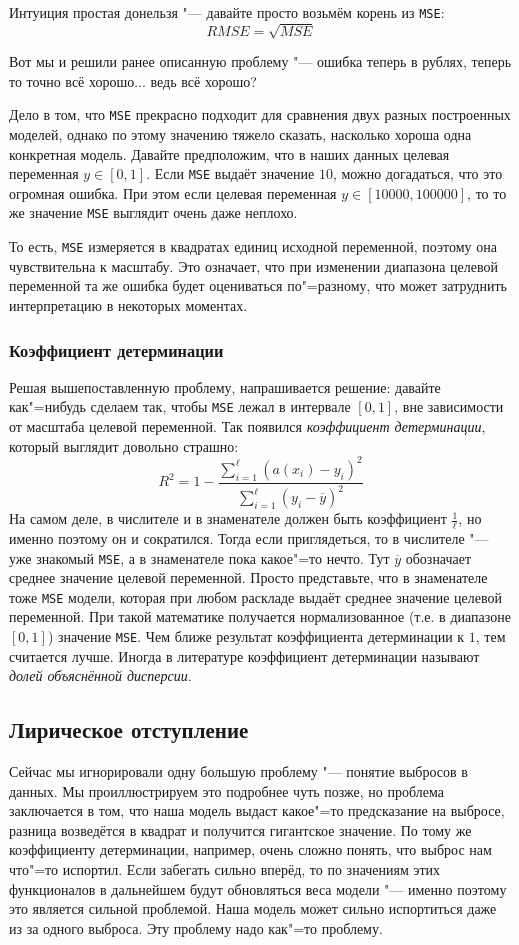 Интуиция простая донельзя "--- давайте просто возьмём корень из 
\texttt{MSE}:
\[
RMSE = \sqrt{MSE}
\]

Вот мы и решили ранее описанную проблему "--- ошибка теперь в рублях, 
теперь то точно всё хорошо... ведь всё хорошо?

Дело в том, что \texttt{MSE} прекрасно подходит для сравнения 
двух разных построенных моделей, однако по этому значению тяжело сказать,
насколько хороша одна конкретная модель. Давайте предположим, что 
в наших данных целевая переменная $y \in [0, 1]$. Если 
\texttt{MSE} выдаёт значение $10$, можно догадаться, что это огромная ошибка. При этом если целевая переменная $y \in [10000, 100000]$, то 
то же значение \texttt{MSE} выглядит очень даже неплохо.

То есть, \texttt{MSE} измеряется в квадратах единиц исходной переменной, поэтому она чувствительна к масштабу. Это означает, 
что при изменении диапазона целевой переменной та же ошибка будет оцениваться по"=разному, что может затруднить интерпретацию
в некоторых моментах.

\subsubsection*{Коэффициент детерминации}
Решая вышепоставленную проблему, напрашивается решение: давайте как"=нибудь сделаем так, чтобы \texttt{MSE} лежал в интервале 
$[0, 1]$, вне зависимости от масштаба целевой переменной. 
Так появился \textit{коэффициент детерминации}, который выглядит довольно
страшно:
\[
R^2 = 1 - \frac{\sum_{i=1}^\ell (a(x_i) - y_i)^2}{\sum_{i=1}^\ell (y_i - \overline{y})^2}
\]
На самом деле, в числителе и в знаменателе 
должен быть коэффициент $\frac{1}{\ell}$, но именно поэтому он и сократился.
Тогда если приглядеться, то в числителе "--- уже знакомый \texttt{MSE}, а в знаменателе пока какое"=то нечто. Тут $\overline{y}$ обозначает среднее значение целевой переменной. Просто представьте, что в знаменателе тоже 
\texttt{MSE} модели, которая при любом раскладе выдаёт среднее значение 
целевой переменной. При такой математике получается нормализованное (т.е. 
в диапазоне $[0, 1]$) значение \texttt{MSE}. Чем ближе результат
коэффициента детерминации к $1$, тем считается лучше. Иногда в 
литературе коэффициент детерминации называют \textit{долей объяснённой дисперсии}.

\subsection*{Лирическое отступление}
Сейчас мы игнорировали одну большую проблему "--- понятие выбросов в 
данных. Мы проиллюстрируем это подробнее чуть позже, но проблема заключается в том, что наша модель выдаст какое"=то предсказание 
на выбросе, разница возведётся в квадрат и получится гигантское значение.
По тому же коэффициенту детерминации, например, очень сложно понять,
что выброс нам что"=то испортил. Если забегать сильно вперёд, то 
по значениям этих функционалов в дальнейшем будут обновляться веса
модели "--- именно поэтому это является сильной проблемой. Наша модель
может сильно испортиться даже из за одного выброса. Эту проблему 
надо как"=то проблему.

